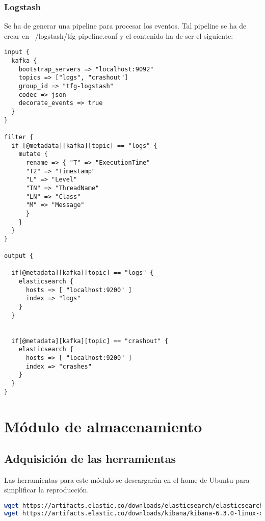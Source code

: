 \subsubsection{Logstash}
Se ha de generar una pipeline para procesar los eventos. Tal pipeline se ha de crear en ~/logstash/tfg-pipeline.conf y el contenido ha de ser el siguiente:

\begin{lstlisting}
input {
  kafka {
    bootstrap_servers => "localhost:9092"
    topics => ["logs", "crashout"]
    group_id => "tfg-logstash"
    codec => json
    decorate_events => true
  }
}

filter {
  if [@metadata][kafka][topic] == "logs" {
    mutate {
      rename => { "T" => "ExecutionTime"
      "T2" => "Timestamp"
      "L" => "Level"
      "TN" => "ThreadName"
      "LN" => "Class"
      "M" => "Message"
      }
    }
  }
}

output {

  if[@metadata][kafka][topic] == "logs" {
    elasticsearch {
      hosts => [ "localhost:9200" ]
      index => "logs"
    }
  }


  if[@metadata][kafka][topic] == "crashout" {
    elasticsearch {
      hosts => [ "localhost:9200" ]
      index => "crashes"
    }
  }
}
\end{lstlisting}


\section{Módulo de almacenamiento}
\subsection{Adquisición de las herramientas}
Las herramientas para este módulo se descargarán en el home de Ubuntu para simplificar la reproducción.
\begin{lstlisting}[language=Bash, breaklines=true]
wget https://artifacts.elastic.co/downloads/elasticsearch/elasticsearch-6.3.0.tar.gz
wget https://artifacts.elastic.co/downloads/kibana/kibana-6.3.0-linux-x86_64.tar.gz
\end{lstlisting}

